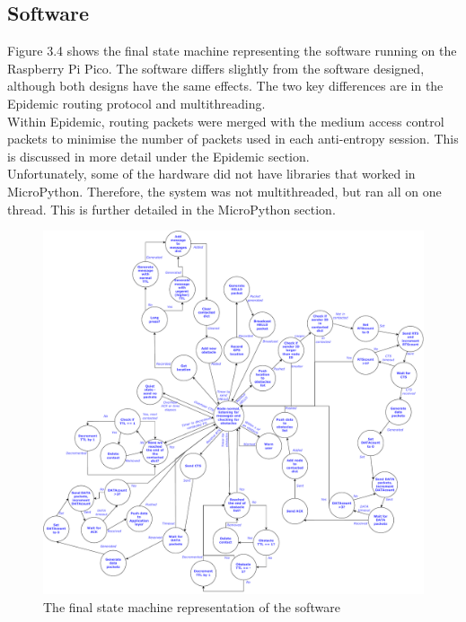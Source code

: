 \documentclass[12pt,a4paper]{report}
\begin{document}
\subsection{Software}
Figure 3.4 shows the final state machine representing the software running on the Raspberry Pi Pico. The software differs slightly from the software designed, although both designs have the same effects. The two key differences are in the Epidemic routing protocol and multithreading. \\ 
Within Epidemic, routing packets were merged with the medium access control packets to minimise the number of packets used in each anti-entropy session. This is discussed in more detail under the Epidemic section. \\
Unfortunately, some of the hardware did not have libraries that worked in MicroPython. Therefore, the system was not multithreaded, but ran all on one thread. This is further detailed in the MicroPython section.
\begin{figure}[h]
\begin{center}
\includegraphics[scale=0.4]{finalMachine.pdf}
\end{center}
\caption{The final state machine representation of the software}
\end{figure}
\FloatBarrier
\end{document}
